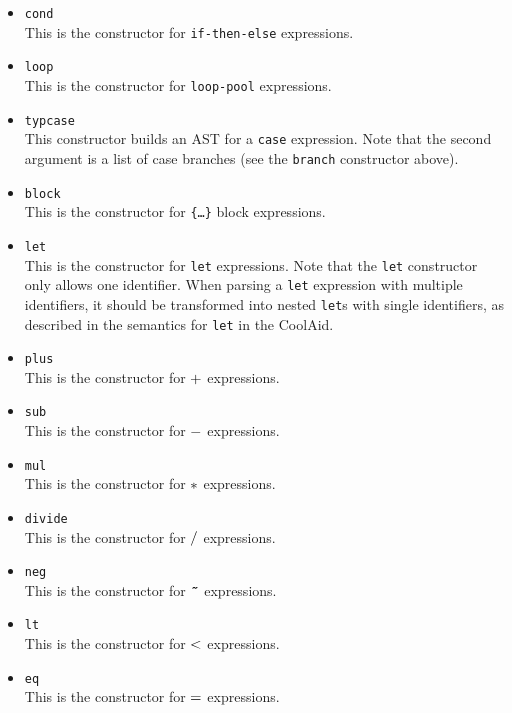 \documentclass[11pt]{article}
\begin{document}
\begin{itemize}
\item {\tt cond} \\
This is the constructor for {\tt if-then-else} expressions.

\item {\tt loop}\\
This is the constructor for {\tt loop-pool} expressions.

\item {\tt typcase}\\
This constructor builds an AST for a {\tt case} expression.  Note that the
second argument is a list of case branches (see the {\tt branch} constructor
above).

\item{\tt block} \\
This is the constructor for {\tt \{\ldots{}\}} block expressions.

\item {\tt let}\\
This is the constructor for {\tt let} expressions. Note that the
{\tt let} constructor only allows one identifier.  When parsing a {\tt let}
expression with multiple identifiers, it should be transformed  into
nested {\tt let}s with single identifiers, as described in the semantics
for {\tt let} in the CoolAid.

\item {\tt plus}\\
This is the constructor for $\tt +$ expressions.

\item {\tt sub}\\
This is the constructor for $\tt -$ expressions.

\item {\tt mul}\\
This is the constructor for $\tt \ast$ expressions.


\item {\tt divide}\\
This is the constructor for $\tt /$ expressions.

\item {\tt neg}\\
This is the constructor for $\tt \;\tilde{ }\;$ expressions.

\item {\tt lt}\\
This is the constructor for $\tt <$ expressions.

\item {\tt eq}\\
This is the constructor for $\tt =$ expressions.


\end{itemize}
\end{document}
